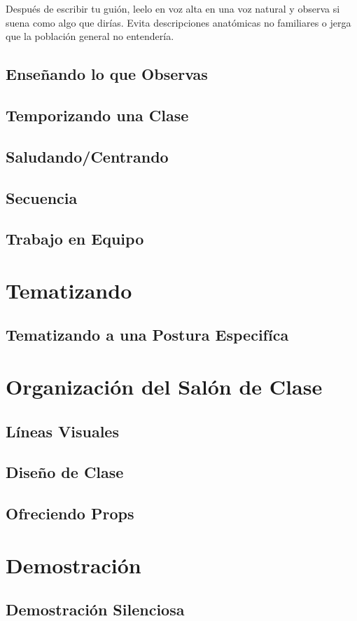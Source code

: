 Despu\'es de escribir tu guión, leelo en voz alta en una voz natural y observa si suena como algo que dirías. Evita descripciones anatómicas no familiares o jerga que la población general no entendería.

\subsection{Enseñando lo que Observas}
\subsection{Temporizando una Clase}
\subsection{Saludando/Centrando}
\subsection{Secuencia}
\subsection{Trabajo en Equipo}
\section{Tematizando}
\subsection{Tematizando a una Postura Especifíca}
\section{Organización del Salón de Clase}
\subsection{Líneas Visuales}
\subsection{Diseño de Clase}
\subsection{Ofreciendo Props}
\section{Demostración}
\subsection{Demostración Silenciosa}
